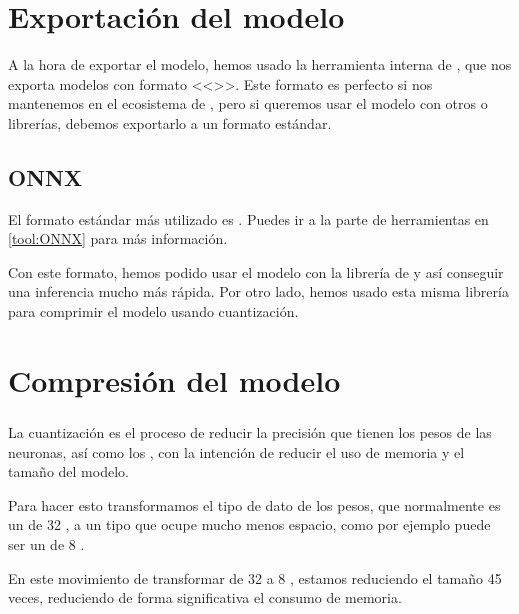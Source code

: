 
\section{Exportación del modelo}

A la hora de exportar el modelo, hemos usado la herramienta interna de , que nos exporta modelos con formato <<>>. Este formato es perfecto si nos mantenemos en el ecosistema de , pero si queremos usar el modelo con otros  o librerías, debemos exportarlo a un formato estándar.

\subsection{ONNX}

El formato estándar más utilizado es . Puedes ir a la parte de herramientas en \ref{tool:ONNX} para más información.

Con este formato, hemos podido usar el modelo con la librería de  y así conseguir una inferencia mucho más rápida. Por otro lado, hemos usado esta misma librería para comprimir el modelo usando cuantización.


\section{Compresión del modelo}

\subsubsection{}

La cuantización es el proceso de reducir la precisión que tienen los pesos de las neuronas, así como los , con la intención de reducir el uso de memoria y el tamaño del modelo.


Para hacer esto transformamos el tipo de dato de los pesos, que normalmente es un  de 32 , a un tipo que ocupe mucho menos espacio, como por ejemplo puede ser un  de 8 .

En este movimiento de transformar de 32 a 8 , estamos reduciendo el tamaño 45 veces, reduciendo de forma significativa el consumo de memoria.


